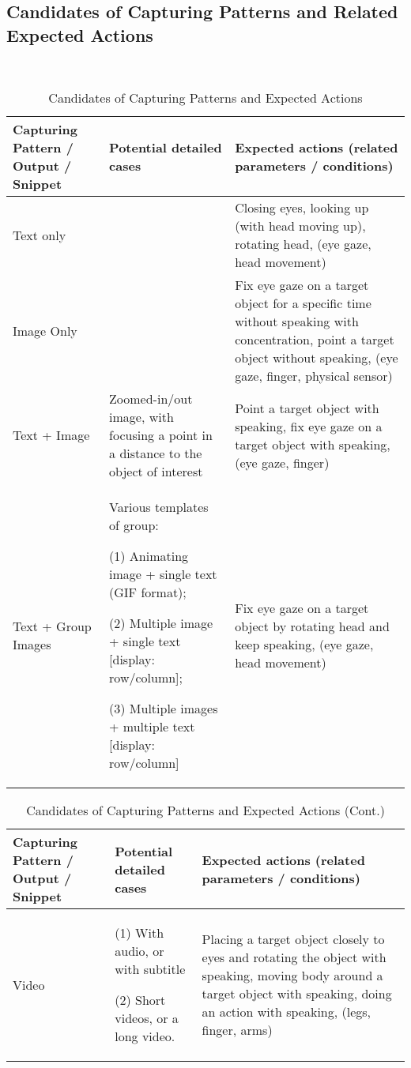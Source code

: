 \documentclass[fyp]{socreport}
\begin{document}
\subsection{Candidates of Capturing Patterns and Related Expected Actions}
~\\
\small
\begin{table}
\begin{tabularx}{\textwidth} { 
  | >{\raggedright\arraybackslash}X 
  | >{\raggedright\arraybackslash}X 
  | >{\raggedright\arraybackslash}X | }
 \hline
 \textbf{Capturing Pattern / Output / Snippet} & \textbf{Potential detailed cases} & \textbf{Expected actions (related parameters / conditions)}\\
 \hline
 Text only & \quad  & Closing eyes, looking up (with head moving up), rotating head, (eye gaze, head movement)\\
 \hline
 Image Only & \quad & Fix eye gaze on a target object for a specific time without speaking with concentration, point a target object without speaking, (eye gaze, finger, physical sensor)\\
 \hline
 Text + Image & Zoomed-in/out image, with focusing a point in a distance to the object of interest & Point a target object with speaking, fix eye gaze on a target object with speaking, (eye gaze, finger)\\
 \hline
 Text + Group Images & Various templates of group: 
 
 (1) Animating image + single text (GIF format); 
 
 (2) Multiple image + single text [display: row/column]; 
 
 (3) Multiple images + multiple text [display: row/column]
 & Fix eye gaze on a target object by rotating head and keep speaking, (eye gaze, head movement)\\
 \hline
\end{tabularx}
\caption{\label{tab:table-name}Candidates of Capturing Patterns and Expected Actions}
\end{table}

\begin{table}
\begin{tabularx}{\textwidth} { 
  | >{\raggedright\arraybackslash}X 
  | >{\raggedright\arraybackslash}X 
  | >{\raggedright\arraybackslash}X | }
 \hline
 \textbf{Capturing Pattern / Output / Snippet} & \textbf{Potential detailed cases} & \textbf{Expected actions (related parameters / conditions)}\\
 \hline
 Video & 
 (1) With audio, or with subtitle
 
 (2) Short videos, or a long video.
 & Placing a target object closely to eyes and rotating the object with speaking, moving body around a target object with speaking, doing an action with speaking, (legs, finger, arms)\\
 \hline
\end{tabularx}
\caption{\label{tab:table-name}Candidates of Capturing Patterns and Expected Actions (Cont.)}
\end{table}
\normalsize
\end{document}
